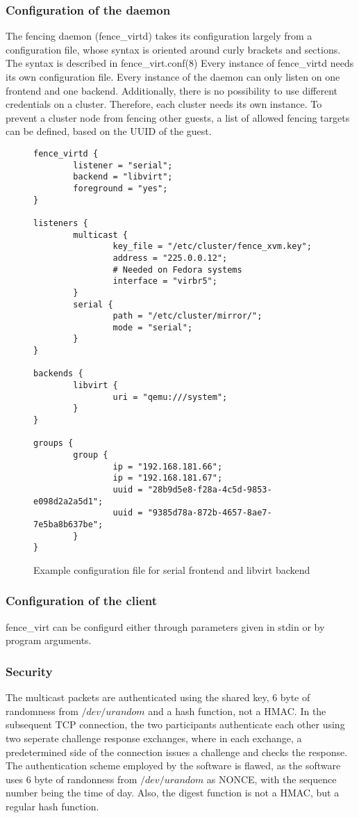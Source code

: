 \subsubsection{Configuration of the daemon}
The fencing daemon (fence\_virtd) takes its configuration largely from
a configuration file, whose syntax is oriented around curly brackets and 
sections. The syntax is described in fence\_virt.conf(8)
Every instance of fence\_virtd needs its own configuration file.
Every instance of the daemon can only listen on one frontend and one backend.
Additionally, there is no possibility to use different credentials on a cluster.
Therefore, each cluster needs its own instance.
To prevent a cluster node from fencing other guests, a list of allowed fencing targets
can be defined, based on the UUID of the guest.
\begin{figure}
\begin{lstlisting}
fence_virtd {
        listener = "serial";
        backend = "libvirt";
        foreground = "yes";
}

listeners {
        multicast {
                key_file = "/etc/cluster/fence_xvm.key";
                address = "225.0.0.12";
                # Needed on Fedora systems
                interface = "virbr5";
        }
        serial {
                path = "/etc/cluster/mirror/";
                mode = "serial";
        }
}

backends {
        libvirt { 
                uri = "qemu:///system";
        }
}

groups {
        group {
                ip = "192.168.181.66";
                ip = "192.168.181.67";
                uuid = "28b9d5e8-f28a-4c5d-9853-e098d2a2a5d1";
                uuid = "9385d78a-872b-4657-8ae7-7e5ba8b637be";
        }
}
\end{lstlisting}
\caption{Example configuration file for serial frontend and libvirt backend}
\end{figure}
\subsubsection{Configuration of the client}
fence\_virt can be configurd either through parameters given in stdin or by
program arguments.
\subsubsection{Security} 
The multicast packets are authenticated using the shared key, 6 byte of
randomness from $/dev/urandom$ and a hash function, not a \ac{HMAC}.
In the subsequent \ac{TCP} connection, the two participants authenticate each other using
two seperate challenge response exchanges, where in each exchange, a predetermined
side of the connection issues a challenge and checks the response.
The authentication scheme employed by the software is flawed, as
the software uses 6 byte of randonness from $/dev/urandom$ as \ac{NONCE},
with the sequence number being the time of day. Also, the digest function
is not a \ac{HMAC}, but a regular hash function.

